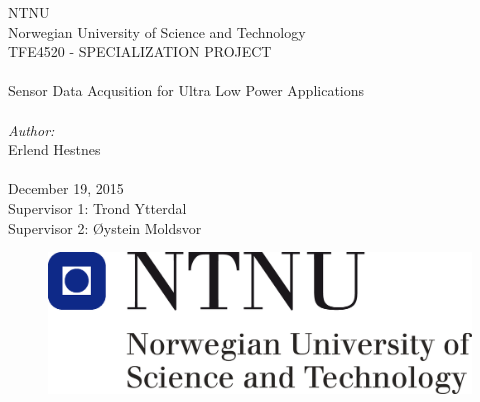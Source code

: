 \thispagestyle{empty}

\begin{center}

\Large{NTNU}\\
\normalsize{Norwegian University of Science and Technology}\\
[3pc]
\Large{TFE4520 - SPECIALIZATION PROJECT}\\

\Huge{\hrulefill\\Sensor Data Acqusition for Ultra Low Power Applications\\\hrulefill}\\[2pc]

\small{\textit{Author:}}\\\Large{Erlend Hestnes}\\
\mbox{}\\[3pc]
\large{December 19, 2015}\\[2pc]

\small{Supervisor 1: Trond Ytterdal} \\
\small{Supervisor 2: Øystein Moldsvor}

\end{center}
\vfill

\begin{figure}[h]
\centering
\includegraphics[scale=0.5]{fig/NTNU.png}
\label{fig:frontpage_logo}
\end{figure}
